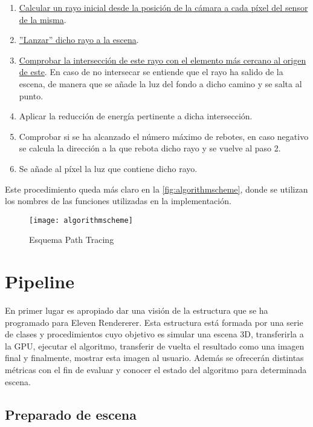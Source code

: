 \begin{enumerate}
	\item \hyperref[sec:calculatecameraray]{Calcular un rayo inicial desde la posición de la cámara a cada píxel del sensor de la misma}.
	\item \hyperref[sec:throwray]{''Lanzar'' dicho rayo a la escena}.
	\item \hyperref[subsec:triintersection]{Comprobar la intersección de este rayo con el elemento más cercano al origen de este}. En caso de no intersecar se entiende que el rayo ha salido de la escena, de manera que se añade la luz del fondo a dicho camino y se salta al punto.
	\item Aplicar la reducción de energía pertinente a dicha intersección.
	\item Comprobar si se ha alcanzado el número máximo de rebotes, en caso negativo se calcula la dirección a la que rebota dicho rayo y se vuelve al paso 2.
	\item Se añade al píxel la luz que contiene dicho rayo.
\end{enumerate}

Este procedimiento queda más claro en la \autoref{fig:algorithmscheme}, donde se utilizan los nombres de las funciones utilizadas en la implementación.

\begin{figure}[H]
    \centering
	\texttt{[image: algorithmscheme]}
	\caption{Esquema Path Tracing}
	\label{fig:algorithmscheme}
\end{figure}



	\section{Pipeline}
		
En primer lugar es apropiado dar una visión de la estructura que se ha programado para Eleven Rendererer. Esta estructura está formada por una serie de clases y procedimientos cuyo objetivo es simular una escena 3D, transferirla a la GPU, ejecutar el algoritmo, transferir de vuelta el resultado como una imagen final y finalmente, mostrar esta imagen al usuario. Además se ofrecerán distintas métricas con el fin de evaluar y conocer el estado del algoritmo para determinada escena.

\subsection{Preparado de escena}

